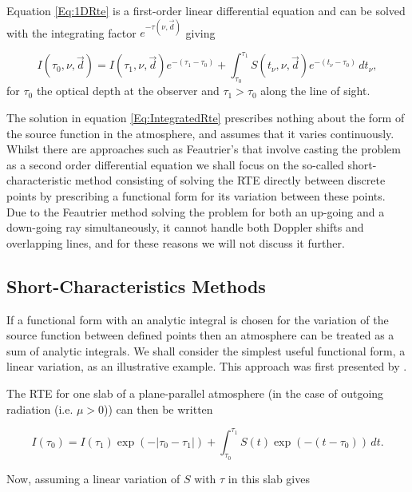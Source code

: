 Equation \eqref{Eq:1DRte} is a first-order linear differential equation and can be solved with the integrating factor $e^{-\tau(\nu, \vec{d})}$ giving

\begin{equation}
I(\tau_0, \nu, \vec{d}) = I(\tau_1, \nu, \vec{d}) e^{-(\tau_1 - \tau_0)} + \int_{\tau_0}^{\tau_1}S(t_\nu, \nu, \vec{d})e^{-(t_\nu - \tau_0)}\, dt_\nu,
\label{Eq:IntegratedRte}
\end{equation}
for $\tau_0$ the optical depth at the observer and $\tau_1 > \tau_0$ along the line of sight.

The solution in equation \eqref{Eq:IntegratedRte} prescribes nothing about the form of the source function in the atmosphere, and assumes that it varies continuously.
Whilst there are approaches such as Feautrier's \citep{Feautrier1964} that involve casting the problem as a second order differential equation we shall focus on the so-called short-characteristic method consisting of solving the RTE directly between discrete points by prescribing a functional form for its variation between these points. Due to the Feautrier method solving the problem for both an up-going and a down-going ray simultaneously, it cannot handle both Doppler shifts and overlapping lines, and for these reasons we will not discuss it further.

\subsection{Short-Characteristics Methods}\label{Sec:ShortChar}

If a functional form with an analytic integral is chosen for the variation of the source function between defined points then an atmosphere can be treated as a sum of analytic integrals. We shall consider the simplest useful functional form, a linear variation, as an illustrative example.
This approach was first presented by \citet{Olson1987}.

The RTE for one slab of a plane-parallel atmosphere (in the case of outgoing radiation (i.e. $\mu > 0$)) can then be written

\begin{equation}
    I(\tau_0) = I(\tau_1) \exp(- |\tau_0 - \tau_1|) + \int_{\tau_0}^{\tau_1} S(t) \exp(-(t - \tau_0))\, dt.
    \label{Eq:ShortCharForm}
\end{equation}

Now, assuming a linear variation of $S$ with $\tau$ in this slab gives

